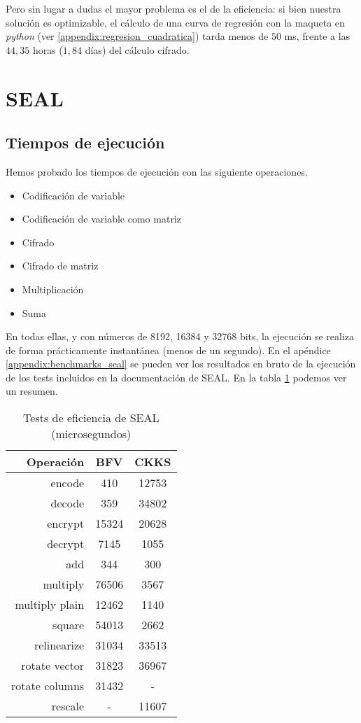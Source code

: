 Pero sin lugar a dudas el mayor problema es el de la eficiencia: si bien nuestra solución es optimizable, el cálculo de una curva de regresión con la maqueta en \textit{python} (ver \ref{appendix:regresion_cuadratica}) tarda menos de $50$ ms, frente a las $44,35$ horas ($1,84$ días) del cálculo cifrado.

\section{SEAL}

\subsection{Tiempos de ejecución}

Hemos probado los tiempos de ejecución con las siguiente operaciones.

\begin{itemize}
    \item Codificación de variable
    \item Codificación de variable como matriz
    \item Cifrado
    \item Cifrado de matriz
    \item Multiplicación
    \item Suma
\end{itemize}

En todas ellas, y con números de 8192, 16384 y 32768 bits, la ejecución se realiza de forma prácticamente instantánea (menos de un segundo). En el apéndice \ref{appendix:benchmarks_seal} se pueden ver los resultados en bruto de la ejecución de los tests incluidos en la documentación de SEAL. En la tabla \ref{table:benchmarks_seal} podemos ver un resumen.

\begin{table}[]
    \centering
    \begin{tabular}{r | c c}
        Operación   & BFV & CKKS  \\
        \hline \hline
        encode  & 410  & 12753 \\
        decode  & 359  & 34802 \\
        encrypt & 15324 & 20628 \\
        decrypt & 7145  & 1055 \\
        add & 344 & 300 \\
        multiply  & 76506  & 3567 \\
        multiply plain  & 12462  & 1140 \\
        square  & 54013  & 2662 \\
        relinearize & 31034 & 33513 \\
        rotate vector  & 31823  & 36967 \\
        rotate columns  & 31432  & - \\
        rescale  & - & 11607
    \end{tabular}
    \caption{Tests de eficiencia de SEAL (microsegundos)}
    \label{table:benchmarks_seal}
\end{table}

